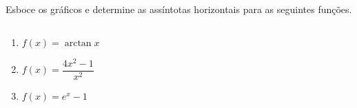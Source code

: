 \begin{frame}
  \begin{example}
    Esboce os gráficos e determine as assíntotas horizontais para as seguintes funções.
  \end{example}
  \begin{columns}[onlytextwidth]
    \begin{column}{0.49\textwidth}
      \begin{enumerate}
        \item<only@1-2> $f(x) = \arctan{x}$
        \item<only@3-4> $f(x) = \dfrac{4x^{2}-1}{x^{2}}$
        \item<only@5-6> $f(x) = e^{x} - 1$
      \end{enumerate}
    \end{column}
    \begin{column}{0.49\textwidth}\vspace{-0.5cm}
      \begin{figure}
      \end{figure}
    \end{column}
  \end{columns}
\end{frame}

